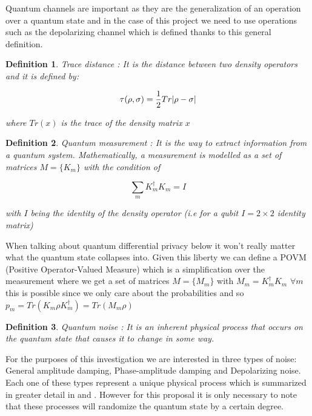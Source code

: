 \documentclass[11pt]{article}
\newtheorem{definition}{Definition}[section]
\begin{document}
Quantum channels are important as they are the generalization of an operation over a quantum state and in the case of this project we need to use operations such as the depolarizing channel which is defined thanks to this general definition.

\begin{definition}
    Trace distance \cite{zhou2017differential}: It is the distance between two density operators and it is defined by:

    $$\tau(\rho, \sigma) = \frac{1}{2}Tr\abs{\rho - \sigma}$$

    where $Tr(x)$ is the trace of the density matrix $x$
\end{definition}

\begin{definition}
    Quantum measurement \cite{zhou2017differential}: It is the way to extract information from a quantum system. Mathematically, a measurement is modelled as a set of matrices $M = \{K_m\}$ with the condition of 

    $$\sum_m K^{\dagger}_{m}K_{m} = I$$

    with $I$ being the identity of the density operator (i.e for a qubit $I = 2\times2$ identity matrix)

\end{definition}

When talking about quantum differential privacy below it won't really matter what the quantum state collapses into. Given this liberty we can define a POVM (Positive Operator-Valued Measure) which is a simplification over the measurement where we get a set of matrices $M = \{M_m\}$ with $M_m = K^{\dagger}_{m}K_{m}$ $\forall m$ this is possible since we only care about the probabilities and so $p_m = Tr(K_{m} \rho K^{\dagger}_{m}) = Tr(M_m\rho)$

\begin{definition}
    Quantum noise \cite{zhou2017differential}: It is an inherent physical process that occurs on the quantum state that causes it to change in some way.
\end{definition}

For the purposes of this investigation we are interested in three types of noise: General amplitude damping, Phase-amplitude damping and Depolarizing noise. Each one of these types represent a unique physical process which is summarized in greater detail in \cite{song2025hybrid} and \cite{zhou2017differential}. However for this proposal it is only necessary to note that these processes will randomize the quantum state by a certain degree. 
\end{document}
